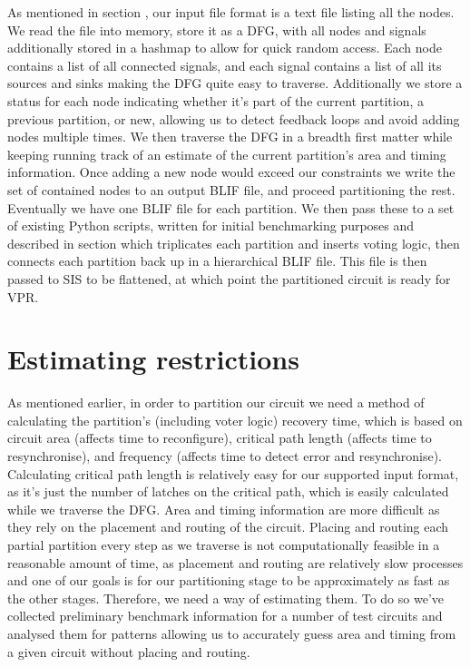 \documentclass[12pt,drafta4paper,oneside]{memoir} %
\begin{document}
As mentioned in section , our input file format is a text file listing all the nodes. We read the file into memory, store it as a \ac{DFG}, with all nodes and signals additionally stored in a hashmap to allow for quick random access. Each node contains a list of all connected signals, and each signal contains a list of all its sources and sinks making the \ac{DFG} quite easy to traverse. Additionally we store a status for each node indicating whether it's part of the current partition, a previous partition, or new, allowing us to detect feedback loops and avoid adding nodes multiple times.
We then traverse the \ac{DFG} in a breadth first matter while keeping running track of an estimate of the current partition's area and timing information. Once adding a new node would exceed our constraints we write the set of contained nodes to an output \ac{BLIF} file, and proceed partitioning the rest. Eventually we have one \ac{BLIF} file for each partition. We then pass these to a set of existing Python scripts, written for initial benchmarking purposes and described in section  which triplicates each partition and inserts voting logic, then connects each partition back up in a hierarchical \ac{BLIF} file. This file is then passed to \ac{SIS}  to be flattened, at which point the partitioned circuit is ready for \ac{VPR}.


\section{Estimating restrictions}
As mentioned earlier, in order to partition our circuit we need a method of calculating the partition's (including voter logic) recovery time, which is based on circuit area (affects time to reconfigure), critical path length (affects time to resynchronise), and frequency (affects time to detect error and resynchronise). Calculating critical path length is relatively easy for our supported input format, as it's just the number of latches on the critical path, which is easily calculated while we traverse the \ac{DFG}.
Area and timing information are more difficult as they rely on the placement and routing of the circuit. Placing and routing each partial partition every step as we traverse is not computationally feasible in a reasonable amount of time, as placement and routing are relatively slow processes and one of our goals is for our partitioning stage to be approximately as fast as the other stages. Therefore, we need a way of estimating them. To do so we've collected preliminary benchmark information for a number of test circuits and analysed them for patterns allowing us to accurately guess area and timing from a given circuit without placing and routing.
\end{document}
